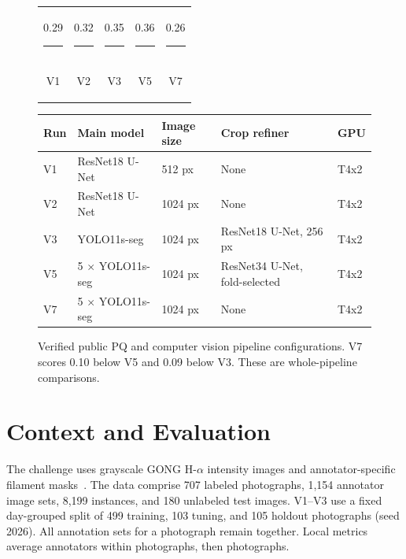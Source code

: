 \documentclass[sigconf]{acmart}
\begin{document}
\begin{figure}[t]
\centering
\large
\begin{tabular}{ccccc}
\shortstack{0.29\\\textcolor{blue!65!black}{\rule{1.1cm}{14.5mm}}\\V1} &
\shortstack{0.32\\\textcolor{orange!85!black}{\rule{1.1cm}{16mm}}\\V2} &
\shortstack{0.35\\\textcolor{green!50!black}{\rule{1.1cm}{17.5mm}}\\V3} &
\shortstack{0.36\\\textcolor{purple!70!black}{\rule{1.1cm}{18mm}}\\V5} &
\shortstack{0.26\\\textcolor{red!65!black}{\rule{1.1cm}{13mm}}\\V7}
\end{tabular}

\smallskip
\normalsize
\begin{tabular}{lllll}
\hline
Run & Main model & Image size & Crop refiner & GPU \\
\hline
V1 & ResNet18 U-Net & 512 px & None & T4x2 \\
V2 & ResNet18 U-Net & 1024 px & None & T4x2 \\
V3 & YOLO11s-seg & 1024 px & ResNet18 U-Net, 256 px & T4x2 \\
V5 & 5 $\times$ YOLO11s-seg & 1024 px & ResNet34 U-Net, fold-selected & T4x2 \\
V7 & 5 $\times$ YOLO11s-seg & 1024 px & None & T4x2 \\
\hline
\end{tabular}
\caption{Verified public PQ and computer vision pipeline configurations. V7 scores 0.10
below V5 and 0.09 below V3. These are whole-pipeline comparisons.}
\label{fig:scores}
\end{figure}

\section{Context and Evaluation}
The challenge uses grayscale GONG H-$\alpha$ intensity images and
annotator-specific filament masks~\cite{filament-segmentation-2026,ahmadzadeh2024dataset}.
The data comprise 707 labeled photographs, 1,154 annotator image sets,
8,199 instances, and 180 unlabeled test images. V1--V3 use a fixed
day-grouped split of 499 training, 103 tuning, and 105 holdout photographs
(seed 2026). All annotation sets for a photograph remain together.
Local metrics average annotators within photographs, then photographs.
\end{document}
